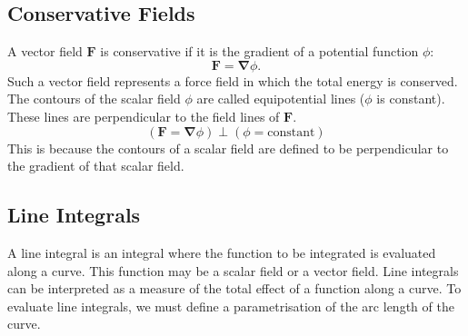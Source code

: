 \documentclass{article}
\begin{document}
\subsection{Conservative Fields}
A vector field \(\symbf{F}\) is conservative if it is the gradient of a
potential function \(\phi\):
\begin{equation*}
    \symbf{F} = \symbf{\nabla} \phi.
\end{equation*}
Such a vector field represents a force field in which the total energy is
conserved.
The contours of the scalar field \(\phi\) are called equipotential
lines (\(\phi\) is constant). These lines are perpendicular to the
field lines of \(\symbf{F}\).
\begin{equation*}
    \left( \symbf{F} = \symbf{\nabla} \phi \right) \perp \left( \phi = \text{constant} \right)
\end{equation*}
This is because the contours of a scalar field are defined to be
perpendicular to the gradient of that scalar field.
\subsection{Line Integrals}
A line integral is an integral where the function to be integrated is
evaluated along a curve. This function may be a scalar field or a
vector field. Line integrals can be interpreted as a measure of the
total effect of a function along a curve.
To evaluate line integrals, we must define a parametrisation of the arc
length of the curve.
\end{document}
